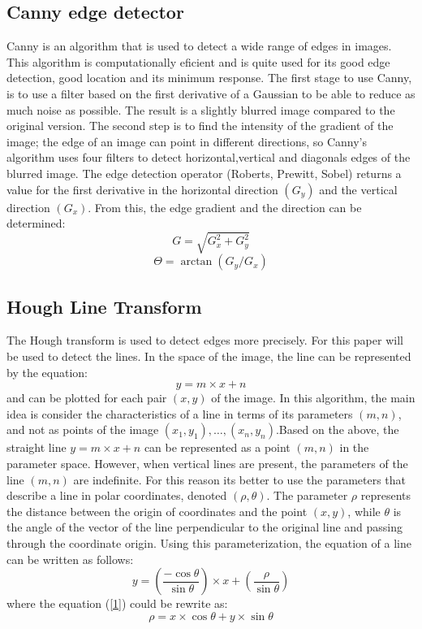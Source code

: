 \documentclass[conference]{IEEEtran}
\begin{document}
\subsection{Canny edge detector}
Canny is an algorithm that is used to detect a wide range of edges in images. This algorithm is computationally eficient and is quite used for its good edge detection, good location and its minimum response.
The first stage to use Canny, is to use a filter based on the first derivative of a Gaussian to be able to reduce as much noise as possible. The result is a slightly blurred image compared to the original version.
The second step is to find the intensity of the gradient of the image; the edge of an image can point in different directions, so Canny's algorithm uses four filters to detect horizontal,vertical and diagonals edges of the blurred image. The edge detection operator (Roberts, Prewitt, Sobel) returns a value for the first derivative in the horizontal direction $(G_{y})$ and the vertical direction $(G_{x})$. From this, the edge gradient and the direction can be determined:
\begin{equation}
G = \sqrt{G_{x}^{2} + G_{y}^2}
\end{equation}
\begin{equation}
\Theta = \arctan(G_{y}/G_{x})
\end{equation}
\subsection{Hough Line Transform}
The Hough transform is used to detect edges more precisely. For this paper will be used to detect the lines. In the space of the image, the line can be represented by the equation:
\begin{equation}
y = m \times x + n
\end{equation}
and can be plotted for each pair $(x,y)$ of the image. In this algorithm, the main idea is consider the characteristics of a line in terms of its parameters $(m,n)$, and not as points of the image $(x_{1},y_{1}),\ldots,(x_{n},y_{n})$.Based on the above, the straight line $y = m \times x + n$ can be represented as a point $(m,n)$ in the parameter space. However, when vertical lines are present, the parameters of the line $(m,n)$ are indefinite. For this reason its better to use the parameters that describe a line in polar coordinates, denoted $(\rho, \theta)$. The parameter $\rho$ represents the distance between the origin of coordinates and the point $(x,y)$, while $\theta$ is the angle of the vector of the line perpendicular to the original line and passing through the coordinate origin. Using this parameterization, the equation of a line can be written as follows:
\begin{equation}
\label{1}
y = (\frac{-\cos\theta}{\sin\theta})\times x + (\frac{\rho}{\sin\theta})
\end{equation}
where the equation (\ref{1}) could be rewrite as:
\begin{equation}
\label{2}
\rho = x \times \cos\theta + y \times \sin\theta
\end{equation}
\end{document}
